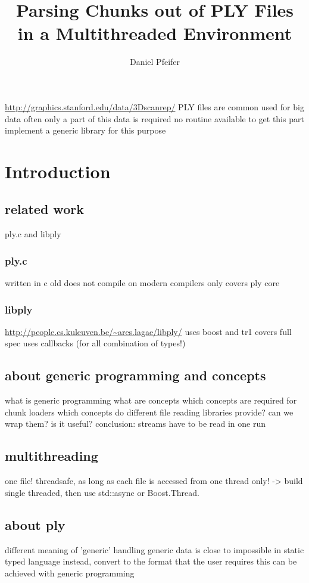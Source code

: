 \documentclass{article}
\title{Parsing Chunks out of PLY Files\\in a Multithreaded Environment}
\author{Daniel Pfeifer}
\begin{document}
\maketitle

\abstract
%
\url{http://graphics.stanford.edu/data/3Dscanrep/}
PLY files are common
used for big data
often only a part of this data is required
no routine available to get this part
implement a generic library for this purpose
%

\section{Introduction}
\subsection{related work}
%
ply.c and libply

\subsubsection{ply.c}
written in c
old
does not compile on modern compilers
only covers ply core

\subsubsection{libply}
\url{http://people.cs.kuleuven.be/~ares.lagae/libply/}
uses boost and tr1
covers full spec
uses callbacks (for all combination of types!)

\subsection{about generic programming and concepts}
%
what is generic programming
what are concepts
which concepts are required for chunk loaders
which concepts do different file reading libraries provide?
can we wrap them?
is it useful?
conclusion: streams have to be read in one run

\subsection{multithreading}
%
one file!
threadsafe, as long as each file is accessed from one thread only!
-> build single threaded, then use std::async or Boost.Thread.

\subsection{about ply}
different meaning of 'generic'
handling generic data is close to impossible in static typed language
instead, convert to the format that the user requires
this can be achieved with generic programming
\end{document}
